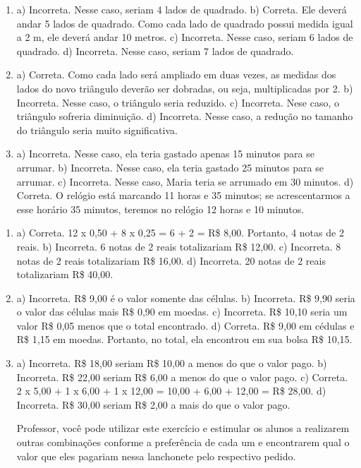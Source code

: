 
\begin{enumerate}
\item
a) Incorreta. Nesse caso, seriam 4 lados de quadrado.
b) Correta. Ele deverá andar 5 lados de quadrado. Como cada lado de quadrado possui
medida igual a 2 m, ele deverá andar 10 metros.
c) Incorreta. Nesse caso, seriam 6 lados de quadrado.
d) Incorreta. Nesse caso, seriam 7 lados de quadrado.

\item
a) Correta. Como cada lado será ampliado em duas vezes, as medidas dos lados do novo
triângulo deverão ser dobradas, ou seja, multiplicadas por 2.
b) Incorreta. Nesse caso, o triângulo seria reduzido.
c) Incorreta. Nese caso, o triângulo sofreria diminuição.
d) Incorreta. Nesse caso, a redução no tamanho do triângulo seria muito significativa.

\item
a) Incorreta. Nesse caso, ela teria gastado apenas 15 minutos para se arrumar.
b) Incorreta. Nesse caso, ela teria gastado 25 minutos para se arrumar.
c) Incorreta. Nesse caso, Maria teria se arrumado em 30 minutos.
d) Correta. O relógio está marcando 11 horas e 35 minutos; se acrescentarmos a esse
horário 35 minutos, teremos no relógio 12 horas e 10 minutos.
\end{enumerate}


\begin{enumerate}
\item
a) Correta.
12 x 0,50 + 8 x 0,25 = 6 + 2 = R\$ 8,00. Portanto, 4 notas de 2 reais.
b) Incorreta. 6 notas de 2 reais totalizariam R\$ 12,00.
c) Incorreta. 8 notas de 2 reais totalizariam R\$ 16,00.
d) Incorreta. 20 notas de 2 reais totalizariam R\$ 40,00.

\item
a) Incorreta. R\$ 9,00 é o valor somente das células.
b) Incorreta. R\$ 9,90 seria o valor das células mais R\$ 0,90 em moedas.
c) Incorreta. R\$ 10,10 seria um valor R\$ 0,05 menos que o total encontrado.
d) Correta. 
R\$ 9,00 em cédulas e R\$ 1,15 em moedas. Portanto, no total, ela
encontrou em sua bolsa R\$ 10,15.

\item
a) Incorreta. R\$ 18,00 seriam R\$ 10,00 a menos do que o valor pago.
b) Incorreta. R\$ 22,00 seriam R\$ 6,00 a menos do que o valor pago.
c) Correta. 2 x 5,00 + 1 x 6,00 + 1 x 12,00 = 10,00 + 6,00 + 12,00 = R\$ 28,00.
d) Incorreta. R\$ 30,00 seriam R\$ 2,00 a mais do que o valor pago.

Professor, você pode utilizar este exercício e estimular os alunos a
realizarem outras combinações conforme a preferência de cada um e
encontrarem qual o valor que eles pagariam nessa lanchonete pelo respectivo pedido.
\end{enumerate}

